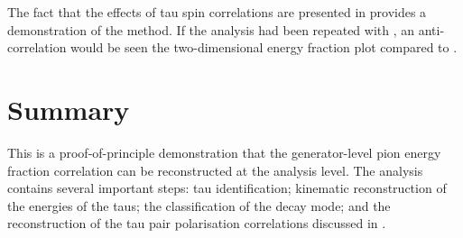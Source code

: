The fact that the effects of tau spin correlations are presented in  provides a demonstration of the method. If the analysis had been repeated with \eeHZQQ, an anti-correlation would be seen the two-dimensional energy fraction plot compared to  .

\section{Summary}
This is a proof-of-principle demonstration that the generator-level pion energy fraction correlation can be reconstructed at the analysis level. The analysis contains several important steps: tau identification; kinematic reconstruction of the energies of the taus; the classification of the  \tauToPionBoth decay mode; and the reconstruction of the tau pair polarisation correlations discussed in .











